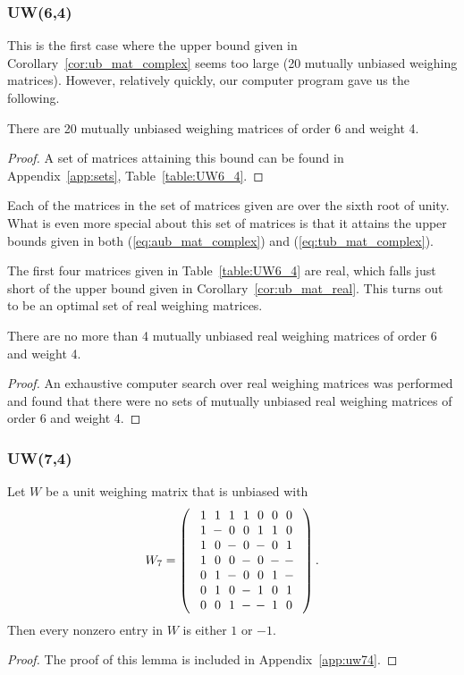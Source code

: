\subsubsection{UW(6,4)}

This is the first case where the upper bound given in Corollary~\ref{cor:ub_mat_complex} seems too large (20 mutually unbiased weighing matrices). However, relatively quickly, our computer program gave us the following.

\begin{theorem} \label{th:uw-6-4}
 There are 20 mutually unbiased weighing matrices of order 6 and weight 4.
 \begin{proof}
  A set of matrices attaining this bound can be found in Appendix~\ref{app:sets}, Table~\ref{table:UW6_4}.
 \end{proof}
\end{theorem}

Each of the matrices in the set of matrices given are over the sixth root of unity. What is even more special about this set of matrices is that it attains the upper bounds given in both (\ref{eq:aub_mat_complex}) and (\ref{eq:tub_mat_complex}).

The first four matrices given in Table~\ref{table:UW6_4} are real, which falls just short of the upper bound given in Corollary~\ref{cor:ub_mat_real}. This turns out to be an optimal set of real weighing matrices.

\begin{theorem}
 There are no more than 4 mutually unbiased real weighing matrices of order 6 and weight 4.
 \begin{proof}
  An exhaustive computer search over real weighing matrices was performed and found that there were no sets of mutually unbiased real weighing matrices of order 6 and weight 4.
 \end{proof}
\end{theorem}

\subsubsection{UW(7,4)}

\begin{lemma} \label{lem:cw_7_4}
 Let $W$ be a unit weighing matrix that is unbiased with
$$W_7=\left(\begin{array}{c}
\Zp\Zp\Zp\Zp\Zz\Zz\Zz\\
\Zp\Zm\Zz\Zz\Zp\Zp\Zz\\
\Zp\Zz\Zm\Zz\Zm\Zz\Zp\\
\Zp\Zz\Zz\Zm\Zz\Zm\Zm\\
\Zz\Zp\Zm\Zz\Zz\Zp\Zm\\
\Zz\Zp\Zz\Zm\Zp\Zz\Zp\\
\Zz\Zz\Zp\Zm\Zm\Zp\Zz
\end{array}\right).$$
Then every nonzero entry in $W$ is either $1$ or $-1$.

 \begin{proof}
  The proof of this lemma is included in Appendix~\ref{app:uw74}.
 \end{proof}
\end{lemma}


